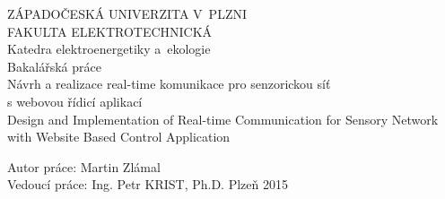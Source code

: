 \documentclass[oneside,12pt,a4paper,final]{book} %
\begin{document}
\pagestyle{empty}
\begin{titlepage}
\noindent
\begin{center}
	{\LARGE ZÁPADOČESKÁ UNIVERZITA V~PLZNI} \\[0.1cm]
	{\LARGE FAKULTA ELEKTROTECHNICKÁ} \\[0.4cm]
	{\Large\sc Katedra elektroenergetiky a~ekologie} \\
	\vspace{5cm}
	{\Huge\sc Bakalářská práce} \\
	\vspace{1cm}
	{\large Návrh a realizace real-time komunikace pro senzorickou síť\\s webovou řídicí aplikací\\}
	\vspace{1cm}
	{\large Design and Implementation of Real-time Communication for Sensory Network with Website Based Control Application}
\end{center}
\vfill
Autor práce: Martin Zlámal\\
Vedoucí práce: Ing. Petr KRIST, Ph.D. \hfill Plzeň 2015
\end{titlepage}

\pagestyle{plain}







\tableofcontents
\cleardoublepage
{}
{}
\listoffigures
\end{document}
